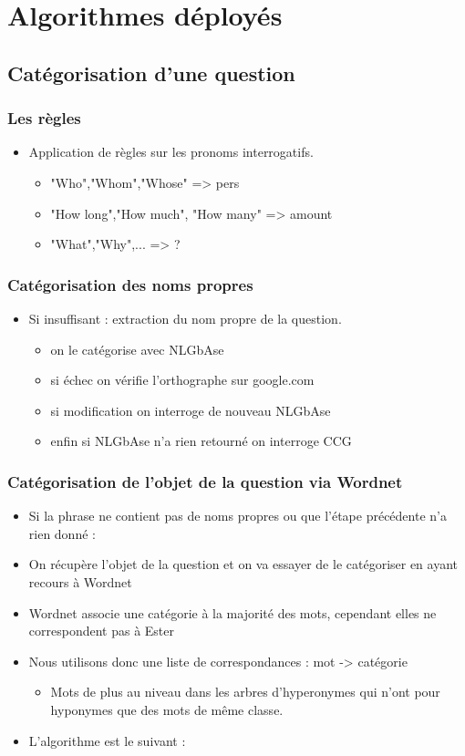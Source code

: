 \documentclass[xcolor=dvipsnames]{beamer}
\begin{document}
\section{Algorithmes déployés}
\subsection{Catégorisation d'une question}
\frame
{
    \frametitle{Les règles}
    \begin{itemize}
        \item Application de règles sur les pronoms interrogatifs.
        \begin{itemize}
            \item "Who","Whom","Whose" => pers
            \item "How long","How much", "How many" => amount
            \item "What","Why",... => ?
        \end{itemize}
    \end{itemize}
}
\frame 
{
    \frametitle{Catégorisation des noms propres}
    \begin{itemize}
        \item Si insuffisant : extraction du nom propre de la question.
        \begin{itemize}
            \item on le catégorise avec NLGbAse
            \item si échec on vérifie l'orthographe sur google.com
            \item si modification on interroge de nouveau NLGbAse
            \item enfin si NLGbAse n'a rien retourné on interroge CCG
        \end{itemize}
    \end{itemize}
}
\frame 
{
    \frametitle{Catégorisation de l'objet de la question via Wordnet}
    \begin{itemize}
        \item Si la phrase ne contient pas de noms propres ou que l'étape précédente n'a rien donné : 
        \item On récupère l'objet de la question et on va essayer de le catégoriser en ayant recours à Wordnet
        \item Wordnet associe une catégorie à la majorité des mots, cependant elles ne correspondent pas à Ester
        \item Nous utilisons donc une liste de correspondances : mot -> catégorie
        \begin{itemize}
            \item Mots de plus au niveau dans les arbres d'hyperonymes qui n'ont pour hyponymes que des mots de même classe.
        \end{itemize}
        \item L'algorithme est le suivant :
    \end{itemize}
}
\end{document}
